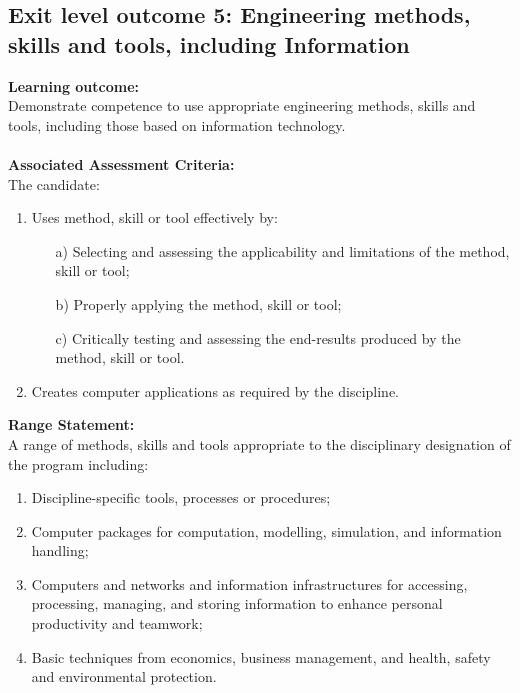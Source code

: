     \subsection{Exit level outcome 5: Engineering methods, skills and tools, 
                including Information}
        {\bf Learning outcome:} \\
        Demonstrate competence to use appropriate 
        engineering methods, skills and tools, including those based on 
        information technology.
        \ \\ \\
        {\bf Associated Assessment Criteria:} \\
        The candidate:
        \begin{enumerate}
            \item Uses method, skill or tool effectively by:
                \begin{itemize}
                    \item[a)] Selecting and assessing the applicability and 
                              limitations of the method, skill or tool;
                    \item[b)] Properly applying the method, skill or tool;
                    \item[c)] Critically testing and assessing the end-results 
                              produced by the method, skill or tool.
                \end{itemize}
            \item Creates computer applications as required by the discipline.
        \end{enumerate}
        {\bf Range Statement:} \\
        A range of methods, skills and tools appropriate 
        to the disciplinary designation of the program including:
        \begin{enumerate}
            \item Discipline-specific tools, processes or procedures;
            \item Computer packages for computation, modelling, simulation, and 
                  information handling;
            \item Computers and networks and information infrastructures for 
                  accessing, processing, managing, and storing information to 
                  enhance personal productivity and teamwork;
            \item Basic techniques from economics, business management, and 
                  health, safety and environmental protection.
        \end{enumerate}
    

